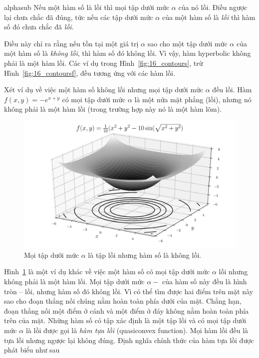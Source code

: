 \begin{mytheo}{}{alphasub}
Nếu một hàm số là lồi thì {mọi} tập dưới mức $\alpha$
của nó lồi. Điều ngược lại chưa chắc đã đúng, tức nếu các tập dưới mức $\alpha$ của một hàm số là \textit{lồi} thì hàm số đó chưa chắc đã \textit{lồi}.
\end{mytheo}


Điều này chỉ ra rằng nếu tồn tại một giá trị $\alpha$ sao cho một tập dưới mức
$\alpha$ của một hàm số là \textit{không lồi}, thì hàm số đó {không lồi}. Vì vậy, hàm hyperbolic không phải là một hàm
lồi. Các ví dụ trong Hình~\ref{fig:16_contours}, trừ Hình~\ref{fig:16_contoursf},
đều tương ứng với các hàm lồi.

Xét ví dụ về việc một hàm số không lồi nhưng mọi
tập dưới mức $\alpha$ đều lồi. Hàm $f(x, y) = -e^{x+y}$ có mọi tập dưới mức
$\alpha$ là một nửa mặt phẳng (lồi), nhưng nó
không phải là một hàm lồi (trong trường hợp này nó là một hàm lõm).

\begin{figure}[t]
\centering
\includegraphics[width = .8\textwidth]{ebookML_src/src/convexity/sin_surf2_cropped.pdf}
\caption[]{Mọi tập dưới mức $\alpha$ là tập lồi nhưng hàm số là không lồi.}
\label{fig:16_ex}
\end{figure}

Hình~\ref{fig:16_ex} là một ví dụ khác về việc một hàm số có mọi tập dưới mức
$\alpha$ {lồi} nhưng không phải là một hàm lồi. Mọi tập dưới mức
$\alpha-$ của hàm số này đều là hình tròn  --  lồi, nhưng
hàm số đó không {lồi}. Vì có thể tìm được hai điểm trên mặt này
sao cho đoạn thẳng nối chúng nằm hoàn toàn phía dưới của mặt. Chẳng hạn,
đoạn thẳng nối một điểm ở
{cánh} và một điểm ở {đáy} không nằm hoàn toàn phía trên của mặt.
Những hàm số có tập xác định là một {tập lồi} và có mọi tập dưới mức $\alpha$
là lồi được gọi là  \textit{hàm tựa lồi} (quasiconvex function). Mọi hàm lồi đều là tựa lồi nhưng ngược lại không đúng. Định nghĩa chính thức của
hàm tựa lồi được phát biểu như sau


